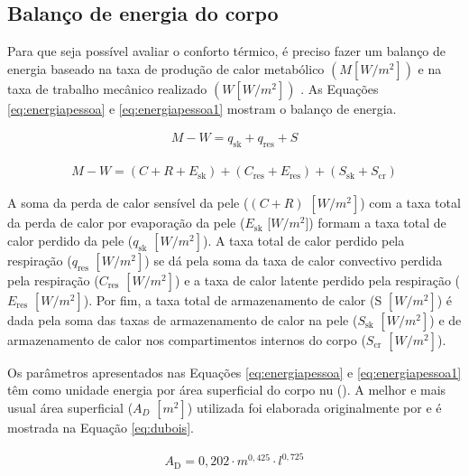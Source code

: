\documentclass[acronym,symbols,table]{fei}
\begin{document}
\subsection{Balanço de energia do corpo} \label{balancocorpo}

Para que seja possível avaliar o conforto térmico, é preciso fazer um balanço de energia baseado na taxa de produção de calor metabólico $(M [W/m^{2}])$ e na taxa de trabalho mecânico realizado $(W [W/m^{2}])$ \cite{ASHRAE2009}. As Equações \ref{eq:energiapessoa} e \ref{eq:energiapessoa1} mostram o balanço de energia.

\begin{equation} \label{eq:energiapessoa}
    \begin{aligned}
    M - W = q_{\text{sk}} + q_{\text{res}} + S
    \end{aligned}
\end{equation}

\begin{equation} \label{eq:energiapessoa1}
    \begin{aligned}
    M - W = (C + R+ E_{\text{sk}}) + (C_{\text{res}} + E_{\text{res}}) + (S_{\text{sk}} + S_{\text{cr}})
    \end{aligned}
\end{equation}

A soma da perda de calor sensível da pele ($(C + R)$ $[W/m^{2}]$) com a taxa total da perda de calor por evaporação da pele ($E_{\text{sk}}$ [$W/m^{2}$]) formam a taxa total de calor perdido da pele ($q_{\text{sk}}$ $[W/m^{2}]$). A taxa total de calor perdido pela respiração ($q_{\text{res}}$ $[W/m^{2}]$) se dá pela soma da taxa de calor convectivo perdida pela respiração ($C_{\text{res}}$ $[W/m^{2}]$) e a taxa de calor latente perdido pela respiração ($E_{\text{res}}$ $[W/m^{2}]$). Por fim, a taxa total de armazenamento de calor (S $[W/m^{2}]$) é dada pela soma das taxas de armazenamento de calor na pele ($S_{\text{sk}}$ $[W/m^{2}]$) e de armazenamento de calor nos compartimentos internos do corpo ($S_{\text{cr}}$ $[W/m^{2}]$).


Os parâmetros apresentados nas Equações \ref{eq:energiapessoa} e \ref{eq:energiapessoa1} têm como unidade energia por área superficial do corpo nu (\textcite{ASHRAE2009}). A melhor e mais usual área superficial ($A_{D}$ $[m^{2}]$) utilizada foi elaborada originalmente por \textcite{dubois1916formula} e é mostrada na Equação \ref{eq:dubois}.

\begin{equation} \label{eq:dubois}
    \begin{aligned}
   A_{\text{D}} = 0,202 \cdot m^{0,425} \cdot l^{0,725}
    \end{aligned}
\end{equation}
\end{document}
